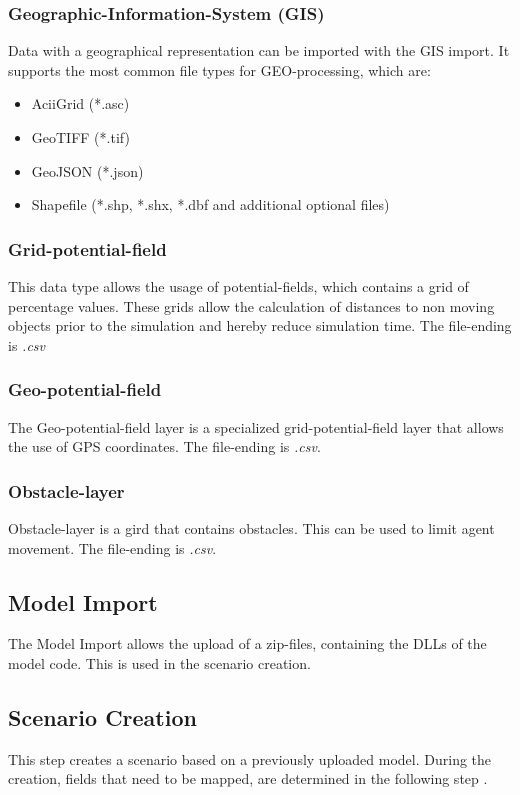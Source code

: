 \subsubsection{Geographic-Information-System (GIS)}
Data with a geographical representation can be imported with the GIS import. It supports the most common file types for GEO-processing, which are:
\begin{itemize}
	\item AciiGrid (*.asc)
	\item GeoTIFF (*.tif)
	\item GeoJSON (*.json)
	\item Shapefile (*.shp, *.shx, *.dbf and additional optional files)
\end{itemize}

\subsubsection{Grid-potential-field}
This data type allows the usage of potential-fields, which contains a grid of percentage values. These grids allow the calculation of distances to non moving objects prior to the simulation and hereby reduce simulation time. The file-ending is \textit{.csv}

\subsubsection{Geo-potential-field}
The Geo-potential-field layer is a specialized grid-potential-field layer that allows the use of GPS coordinates. The file-ending is \textit{.csv}.

\subsubsection{Obstacle-layer}
Obstacle-layer is a gird that contains obstacles. This can be used to limit agent movement. The file-ending is \textit{.csv}.


\subsection{Model Import}
The Model Import allows the upload of a zip-files, containing the DLLs of the model code. This is used in the scenario creation.


\subsection{Scenario Creation}
This step creates a scenario based on a previously uploaded model. During the creation, fields that need to be mapped, are determined in the following step .



